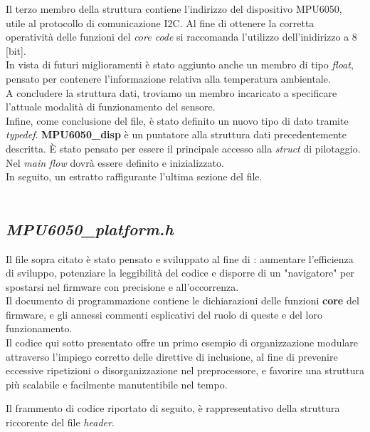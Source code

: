 Il terzo membro della struttura contiene l'indirizzo del dispositivo MPU6050, utile al protocollo di comunicazione I2C. Al fine di ottenere la corretta operatività delle funzioni del \textit{core code} si raccomanda l'utilizzo dell'inidirizzo a 8 [bit].\\
In vista di futuri miglioramenti è stato aggiunto anche un membro di tipo \textit{float}, pensato per contenere l'informazione relativa alla temperatura ambientale.\\
A concludere la struttura dati, troviamo un membro incaricato a specificare l'attuale modalità di funzionamento del sensore.\\
Infine, come conclusione del file, è stato definito un nuovo tipo di dato tramite \textit{typedef}. \textbf{MPU6050\_disp} è un puntatore alla struttura dati precedentemente descritta. È stato pensato per essere il principale accesso alla \textit{struct} di pilotaggio. Nel \textit{main flow} dovrà essere definito e inizializzato.\\
In seguito, un estratto raffigurante l'ultima sezione del file.\\\\

\subsection{\textit{MPU6050\_platform.h}}
Il file sopra citato è stato pensato e sviluppato al fine di : aumentare l'efficienza di sviluppo, potenziare la leggibilità del codice e disporre di un "navigatore" per spostarsi nel firmware con precisione e all'occorrenza.\\
Il documento di programmazione contiene le dichiarazioni delle funzioni \textbf{core} del firmware, e gli annessi commenti esplicativi del ruolo di queste e del loro funzionamento.\\
Il codice qui sotto presentato offre un primo esempio di organizzazione modulare attraverso l'impiego corretto delle direttive di inclusione, al fine di prevenire eccessive ripetizioni o disorganizzazione nel preprocessore, e favorire una struttura più scalabile e facilmente manutentibile nel tempo.

Il frammento di codice riportato di seguito, è rappresentativo della struttura riccorente del file \textit{header}.

